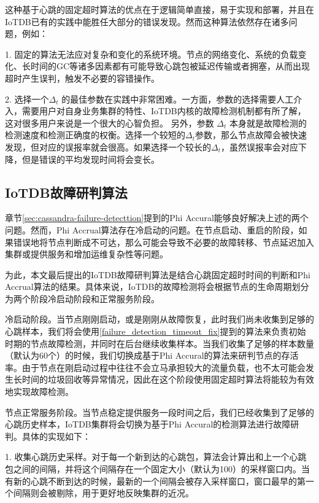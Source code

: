 这种基于心跳的固定超时算法的优点在于逻辑简单直接，易于实现和部署，并且在IoTDB已有的实践中能胜任大部分的错误发现。然而这种算法依然存在诸多问题，例如：

1. 固定的算法无法应对复杂和变化的系统环境。节点的网络变化、系统的负载变化、长时间的GC等诸多因素都有可能导致心跳包被延迟传输或者拥塞，从而出现超时产生误判，触发不必要的容错操作。

2. 选择一个$\Delta_{t}$ 的最佳参数在实践中非常困难。一方面，参数的选择需要人工介入，需要用户对自身业务集群的特性、IoTDB内核的故障检测机制都有所了解，这对很多用户来说是一个很大的心智负担。
另外，参数 $\Delta_{t}$ 本身就是故障检测的检测速度和检测正确度的权衡。选择一个较短的$\Delta_{t}$参数，那么节点故障会被快速发现，但对应的误报率就会很高。如果选择一个较长的$\Delta_{t}$，虽然误报率会对应下降，但是错误的平均发现时间将会变长。

\subsection{IoTDB故障研判算法}

章节\ref{sec:cassandra-failure-detecttion}提到的Phi Accural能够良好解决上述的两个问题。然而，Phi Accrual算法存在冷启动的问题。在节点启动、重启的阶段，如果错误地将节点判断成不可达，那么可能会导致不必要的故障转移、节点延迟加入集群或提供服务和增加运维复杂性等问题。

为此，本文最后提出的IoTDB故障研判算法是结合心跳固定超时时间的判断和Phi Accrual算法的结果。具体来说，IoTDB的故障检测将会根据节点的生命周期划分为两个阶段冷启动阶段和正常服务阶段。

冷启动阶段。当节点刚刚启动，或是刚刚从故障恢复，此时我们尚未收集到足够的心跳样本，我们将会使用\ref{failure_detection_timeout_fix}提到的算法来负责初始时期的节点故障检测，并同时在后台继续收集样本。当我们收集了足够的样本数量（默认为60个）的时候，我们切换成基于Phi Accural的算法来研判节点的存活率。由于节点在刚启动过程中往往不会立马承担较大的流量负载，也不太可能会发生长时间的垃圾回收等异常情况，因此在这个阶段使用固定超时算法将能较为有效地实现故障检测。

节点正常服务阶段。当节点稳定提供服务一段时间之后，我们已经收集到了足够的心跳历史样本，IoTDB集群将会切换为基于Phi Accural的检测算法进行故障研判。具体的实现如下：

1. 收集心跳历史采样。对于每一个新到达的心跳包，算法会计算出和上一个心跳包之间的间隔，并将这个间隔存在一个固定大小（默认为100）的采样窗口内。当有新的心跳不断到达的时候，最新的一个间隔会被存入采样窗口，窗口最早的第一个间隔则会被剔除，用于更好地反映集群的近况。

